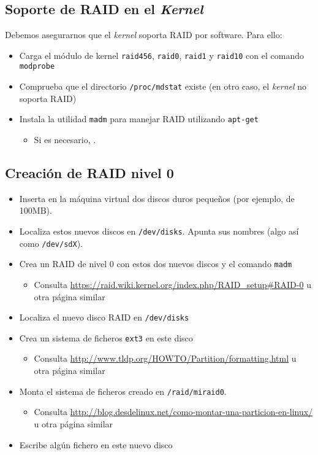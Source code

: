 \subsection{Soporte de RAID en el \textit{Kernel}}
Debemos asegurarnos que el \textit{kernel} soporta RAID por software. Para ello:
\begin{itemize}
\item Carga el módulo de kernel \texttt{raid456}, \texttt{raid0}, \texttt{raid1} y \texttt{raid10} con el comando \texttt{modprobe}
\item Comprueba que el directorio \texttt{/proc/mdstat} existe (en otro caso, el \textit{kernel} no soporta RAID)
\item Instala la utilidad \texttt{madm} para manejar RAID utilizando \texttt{apt-get}
  \begin{itemize}
  \item Si es necesario, .
\end{itemize}
\end{itemize}

\subsection{Creación de RAID nivel 0}

\begin{itemize}
\item Inserta en la máquina virtual dos discos duros pequeños (por ejemplo, de 100MB).
\item Localiza estos nuevos discos en \texttt{/dev/disks}. Apunta sus nombres (algo así como \texttt{/dev/sdX}).
\item Crea un RAID de nivel 0 con estos dos nuevos discos y el comando \texttt{madm}
  \begin{itemize}
  \item Consulta \url{https://raid.wiki.kernel.org/index.php/RAID_setup\#RAID-0} u otra página similar
  \end{itemize}
\item Localiza el nuevo disco RAID en \texttt{/dev/disks}
\item Crea un sistema de ficheros \texttt{ext3} en este disco
  \begin{itemize}
  \item Consulta \url{http://www.tldp.org/HOWTO/Partition/formatting.html} u otra página similar
  \end{itemize}
\item Monta el sistema de ficheros creado en \texttt{/raid/miraid0}.
  \begin{itemize}
  \item Consulta \url{http://blog.desdelinux.net/como-montar-una-particion-en-linux/} u otra página similar
  \end{itemize}
\item Escribe algún fichero en este nuevo disco
\end{itemize}


